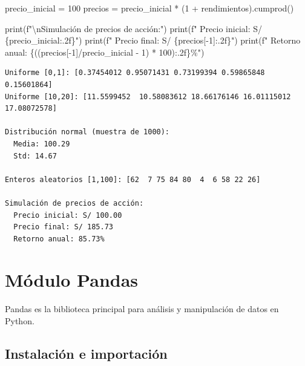 \documentclass[
  doc,
  floatsintext,
  longtable,
  a4paper,
  nolmodern,
  notxfonts,
  notimes,
  12pt,
  colorlinks=true,linkcolor=blue,citecolor=blue,urlcolor=blue]{apa7}
\newenvironment{Shaded}{\begin{snugshade}}{\end{snugshade}}
\newcommand{\BuiltInTok}[1]{\textcolor[rgb]{0.00,0.23,0.31}{#1}}
\newcommand{\CharTok}[1]{\textcolor[rgb]{0.13,0.47,0.30}{#1}}
\newcommand{\DecValTok}[1]{\textcolor[rgb]{0.68,0.00,0.00}{#1}}
\newcommand{\NormalTok}[1]{\textcolor[rgb]{0.00,0.23,0.31}{#1}}
\newcommand{\OperatorTok}[1]{\textcolor[rgb]{0.37,0.37,0.37}{#1}}
\newcommand{\SpecialCharTok}[1]{\textcolor[rgb]{0.37,0.37,0.37}{#1}}
\newcommand{\SpecialStringTok}[1]{\textcolor[rgb]{0.13,0.47,0.30}{#1}}
\begin{document}
\begin{Shaded}
\begin{Highlighting}[]
\NormalTok{precio\_inicial }\OperatorTok{=} \DecValTok{100}
\NormalTok{precios }\OperatorTok{=}\NormalTok{ precio\_inicial }\OperatorTok{*}\NormalTok{ (}\DecValTok{1} \OperatorTok{+}\NormalTok{ rendimientos).cumprod()}

\BuiltInTok{print}\NormalTok{(}\SpecialStringTok{f"}\CharTok{\textbackslash{}n}\SpecialStringTok{Simulación de precios de acción:"}\NormalTok{)}
\BuiltInTok{print}\NormalTok{(}\SpecialStringTok{f"  Precio inicial: S/ }\SpecialCharTok{\{}\NormalTok{precio\_inicial}\SpecialCharTok{:.2f\}}\SpecialStringTok{"}\NormalTok{)}
\BuiltInTok{print}\NormalTok{(}\SpecialStringTok{f"  Precio final: S/ }\SpecialCharTok{\{}\NormalTok{precios[}\OperatorTok{{-}}\DecValTok{1}\NormalTok{]}\SpecialCharTok{:.2f\}}\SpecialStringTok{"}\NormalTok{)}
\BuiltInTok{print}\NormalTok{(}\SpecialStringTok{f"  Retorno anual: }\SpecialCharTok{\{}\NormalTok{((precios[}\OperatorTok{{-}}\DecValTok{1}\NormalTok{]}\OperatorTok{/}\NormalTok{precio\_inicial }\OperatorTok{{-}} \DecValTok{1}\NormalTok{) }\OperatorTok{*} \DecValTok{100}\NormalTok{)}\SpecialCharTok{:.2f\}}\SpecialStringTok{\%"}\NormalTok{)}
\end{Highlighting}
\end{Shaded}

\begin{verbatim}
Uniforme [0,1]: [0.37454012 0.95071431 0.73199394 0.59865848 0.15601864]
Uniforme [10,20]: [11.5599452  10.58083612 18.66176146 16.01115012 17.08072578]

Distribución normal (muestra de 1000):
  Media: 100.29
  Std: 14.67

Enteros aleatorios [1,100]: [62  7 75 84 80  4  6 58 22 26]

Simulación de precios de acción:
  Precio inicial: S/ 100.00
  Precio final: S/ 185.73
  Retorno anual: 85.73%
\end{verbatim}

\section{Módulo Pandas}\label{muxf3dulo-pandas}

Pandas es la biblioteca principal para análisis y manipulación de datos
en Python.

\subsection{Instalación e
importación}\label{instalaciuxf3n-e-importaciuxf3n-1}
\end{document}
